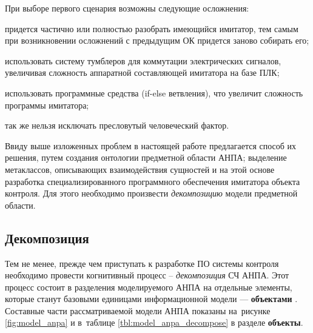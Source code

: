 При выборе первого сценария возможны следующие осложнения:
\begin{enumerate*}[label=\arabic*\upshape)]
    \item придется частично или полностью разобрать имеющийся имитатор, тем самым при возникновении 
        осложнений с предыдущим ОК придется заново собирать его;
    \item использовать систему тумблеров для коммутации электрических сигналов,
        увеличивая сложность аппаратной составляющей имитатора на базе ПЛК;
    \item использовать программные средства (if-else ветвления), что увеличит сложность программы имитатора;
    \item так же нельзя исключать пресловутый человеческий фактор.
\end{enumerate*}

Ввиду выше изложенных проблем в настоящей работе предлагается способ их решения,
путем создания онтологии предметной области АНПА;
выделение метаклассов, описывающих взаимодействия сущностей
и на этой основе разработка специализированного программного обеспечения
имитатора объекта контроля. Для этого необходимо произвести \textit{декомпозицию} модели предметной области.

\subsection{Декомпозиция} \label{sec:anpa_decompose}

Тем не менее, прежде чем приступать к разработке ПО системы контроля необходимо провести когнитивный процесс -- \textit{декомпозиция} СЧ АНПА.
Этот процесс состоит в разделения моделируемого АНПА на отдельные элементы, которые станут базовыми единицами информационной модели --- \textbf{объектами} \cite{journal:vestnik_igeu:elizarova}.
Составные части рассматриваемой модели АНПА показаны на~рисунке \ref{fig:model_anpa} и в~таблице \ref{tbl:model_anpa_decompose} в разделе \textbf{объекты}.

